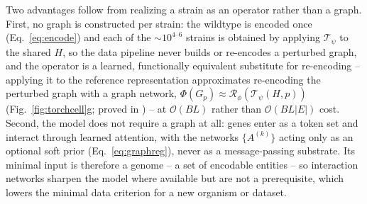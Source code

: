 Two advantages follow from realizing a strain as an operator rather than a graph. First,
no graph is constructed per strain: the wildtype is encoded once (Eq.~\ref{eq:encode}) and
each of the ${\sim}10^{4\text{--}6}$ strains is obtained by applying $\mathcal{T}_\psi$ to
the shared $H$, so the data pipeline never builds or re-encodes a perturbed graph, and the
operator is a learned, functionally equivalent substitute for re-encoding -- applying it to
the reference representation approximates re-encoding the perturbed graph with a graph
network, $\Phi(G_p)\approx\mathcal{R}_\phi(\mathcal{T}_\psi(H,p))$
(Fig.~\ref{fig:torchcell}g; proved in ) -- at
$\mathcal{O}(BL)$ rather than $\mathcal{O}(BL\lvert E\rvert)$ cost. Second, the model does
not require a graph at all: genes enter as a token set and interact through learned
attention, with the networks $\{A^{(k)}\}$ acting only as an optional soft prior
(Eq.~\ref{eq:graphreg}), never as a message-passing substrate. Its minimal input is
therefore a genome -- a set of encodable entities -- so interaction networks sharpen the
model where available but are not a prerequisite, which lowers the minimal data criterion
for a new organism or dataset.

